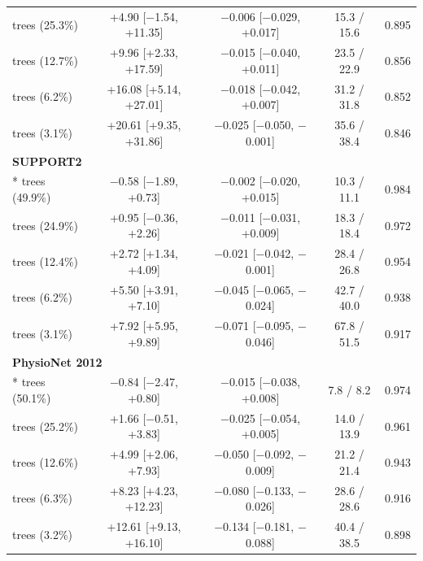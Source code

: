 \begin{table}[!htb]
{\begin{tabular}{lcccc}
\quad 32 trees (25.3\%) & +4.90 [$-$1.54, +11.35] & $-$0.006 [$-$0.029, +0.017] & 15.3 / 15.6 & 0.895 \\
\quad 16 trees (12.7\%) & +9.96 [+2.33, +17.59] & $-$0.015 [$-$0.040, +0.011] & 23.5 / 22.9 & 0.856 \\
\quad 8 trees (6.2\%) & +16.08 [+5.14, +27.01] & $-$0.018 [$-$0.042, +0.007] & 31.2 / 31.8 & 0.852 \\
\quad 4 trees (3.1\%) & +20.61 [+9.35, +31.86] & $-$0.025 [$-$0.050, $-$0.001] & 35.6 / 38.4 & 0.846 \\
\midrule
\multicolumn{5}{l}{\textbf{SUPPORT2}} \\*
\quad 64 trees (49.9\%) & $-$0.58 [$-$1.89, +0.73] & $-$0.002 [$-$0.020, +0.015] & 10.3 / 11.1 & 0.984 \\
\quad 32 trees (24.9\%) & +0.95 [$-$0.36, +2.26] & $-$0.011 [$-$0.031, +0.009] & 18.3 / 18.4 & 0.972 \\
\quad 16 trees (12.4\%) & +2.72 [+1.34, +4.09] & $-$0.021 [$-$0.042, $-$0.001] & 28.4 / 26.8 & 0.954 \\
\quad 8 trees (6.2\%) & +5.50 [+3.91, +7.10] & $-$0.045 [$-$0.065, $-$0.024] & 42.7 / 40.0 & 0.938 \\
\quad 4 trees (3.1\%) & +7.92 [+5.95, +9.89] & $-$0.071 [$-$0.095, $-$0.046] & 67.8 / 51.5 & 0.917 \\
\midrule
\multicolumn{5}{l}{\textbf{PhysioNet 2012}} \\*
\quad 64 trees (50.1\%) & $-$0.84 [$-$2.47, +0.80] & $-$0.015 [$-$0.038, +0.008] & 7.8 / 8.2 & 0.974 \\
\quad 32 trees (25.2\%) & +1.66 [$-$0.51, +3.83] & $-$0.025 [$-$0.054, +0.005] & 14.0 / 13.9 & 0.961 \\
\quad 16 trees (12.6\%) & +4.99 [+2.06, +7.93] & $-$0.050 [$-$0.092, $-$0.009] & 21.2 / 21.4 & 0.943 \\
\quad 8 trees (6.3\%) & +8.23 [+4.23, +12.23] & $-$0.080 [$-$0.133, $-$0.026] & 28.6 / 28.6 & 0.916 \\
\quad 4 trees (3.2\%) & +12.61 [+9.13, +16.10] & $-$0.134 [$-$0.181, $-$0.088] & 40.4 / 38.5 & 0.898 \\
\bottomrule
\end{tabular}}
\end{table}
